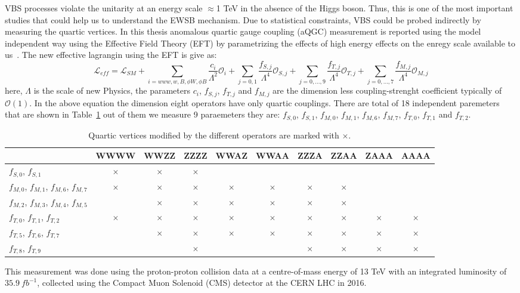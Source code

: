 VBS processes violate the unitarity at an energy scale $\approx$1 TeV in the absence of the Higgs boson. Thus, this is one of the most important studies that could help us to understand the EWSB mechanism. Due to statistical constraints, VBS could be probed indirectly by measuring the quartic vertices. In this thesis anomalous quartic gauge coupling (aQGC) measurement is reported using the model independent way using the Effective Field Theory (EFT) by parametrizing the effects of high energy effects on the enregy scale available to us~\cite{aqgc_operators}. The new effective lagrangin using the EFT is give as:
\begin{equation}
	\mathcal{L}_{eff} = \mathcal{L}_{SM} + \sum_{i=www,w,B, \phi W, \phi B} \frac{c_i}{\Lambda^2} {\mathcal{O}}_i + \sum_{j=0,1}\frac{f_{S,j}}{\Lambda^4} \mathcal{O}_{S,j} + \sum_{j=0,...,9}\frac{f_{T,j}}{\Lambda^4} \mathcal{O}_{T,j}  + \sum_{j=0,...,7} \frac{f_{M,j}}{\Lambda^4} \mathcal{O}_{M,j}
\end{equation}
here, $\Lambda$ is the scale of new Physics, the parameters $c_i$, $f_{S,j}$, $f_{T,j}$ and $f_{M,j}$ are the dimension less coupling-strenght coefficient typically of $\mathcal{O}(1)$. In the above equation the dimension eight operators have only quartic couplings. There are total of 18 independent paremeters that are shown in Table~\ref{table:aQGC_alloperator} out of them we measure 9 paraemeters they are: $f_{S,0}$, $f_{S,1}$, $f_{M,0}$, $f_{M,1}$, $f_{M,6}$, $f_{M,7}$, $f_{T,0}$, $f_{T,1}$ and $f_{T,2}$. 
\begin{table}
\centering
{\scriptsize
\begin{tabular}[!htbp]{|l | c  |c  |c  |c  |c  |c  |c | c  |c |}
\hline
    & WWWW & WWZZ & ZZZZ & WWAZ & WWAA & ZZZA & ZZAA & ZAAA & AAAA \\
\hline
$f_{S,0}$, $f_{S,1}$ &$\times$ & $\times$&$\times$ & & & & & & \\
\hline
$f_{M,0}$, $f_{M,1}$, $f_{M,6}$, $f_{M,7}$  &$\times$ &$\times$ &$\times$ &$\times$ &$\times$ &$\times$ &$\times$ & & \\
\hline
$f_{M,2}$, $f_{M,3}$, $f_{M,4}$, $f_{M,5}$  & &$\times$ &$\times$ &$\times$ &$\times$ &$\times$ &$\times$ & & \\
\hline
$f_{T,0}$, $f_{T,1}$, $f_{T,2}$ &$\times$ &$\times$ &$\times$ &$\times$ &$\times$ &$\times$ &$\times$ &$\times$ &$\times$ \\
\hline
$f_{T,5}$, $f_{T,6}$, $f_{T,7}$ & &$\times$ &$\times$ &$\times$ &$\times$ &$\times$ &$\times$ &$\times$ &$\times$ \\
\hline
$f_{T,8}$, $f_{T,9}$  & & &$\times$ & & &$\times$ &$\times$ &$\times$ &$\times$ \\
\hline
\end{tabular}
\caption{Quartic vertices modified by the different operators are marked with $\times$.}
\label{table:aQGC_alloperator}}
\end{table}
This measurement was done using the proton-proton collision data at a centre-of-mass energy of 13 TeV with an integrated luminosity of $35.9~fb^{-1}$, collected using the Compact Muon Solenoid (CMS) detector at the CERN LHC in 2016.

